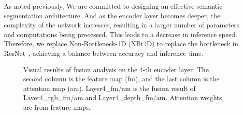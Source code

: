 \documentclass[journal,twoside,web]{ieeecolor}
\begin{document}
As noted previously, We are committed to designing an effective semantic segmentation architecture.  And as the encoder layer becomes deeper, the complexity of the network increases, resulting in a larger number of parameters and computations being processed. This leads to a decrease in inference speed. Therefore, we replace Non-Bottleneck-1D (NBt1D) to replace the bottleneck in ResNet~\cite{EMSANet}, achieving a balance between accuracy and inference time.
\begin{figure}[!t]
	\centering
{}\hspace{-0.8em}
	\hspace{-0.8em}
	\hspace{-0.8em}
	\hspace{-0.8em}
	\hspace{-0.8em}
	\hspace{-0.8em}
	\hspace{-0.8em}
	\hspace{-0.8em}	
	\caption{Visual results of fusion analysis on the 4-th encoder layer. The second column is the feature map (fm), and the last column is the attention map (am). Layer4\_fm/am is the fusion result of Layer4\_rgb\_fm/am and Layer4\_depth\_fm/am. Attention weights are from feature maps.}
	\label{fig:attention}
\end{figure}
\end{document}

